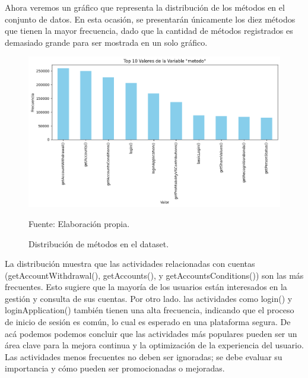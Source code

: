 Ahora veremos un gráfico que representa la distribución de los métodos en el conjunto de datos. En esta ocasión, se presentarán únicamente los diez métodos que tienen la mayor frecuencia, dado que la cantidad de métodos registrados es demasiado grande para ser mostrada en un solo gráfico.

\begin{figure}[H]
    \begin{minipage}[t]{0.9\textwidth}
        \caption{Distribución de métodos en el dataset.}
        \label{frecuencia-metodos}        
    \end{minipage}

    \vspace{10pt}

    \begin{minipage}[b]{1.0\textwidth}
        \centering
        \includegraphics[width=\textwidth]{img/frecuencia-metodo.png}        
    \end{minipage}

    \begin{minipage}[t]{0.9\textwidth}
        Fuente: Elaboración propia.
    \end{minipage}
\end{figure}

La distribución muestra que las actividades relacionadas con cuentas (getAccountWithdrawal(), getAccounts(), y getAccountsConditions()) son las más frecuentes. Esto sugiere que la mayoría de los usuarios están interesados en la gestión y consulta de sus cuentas. Por otro lado. las actividades como login() y loginApplication() también tienen una alta frecuencia, indicando que el proceso de inicio de sesión es común, lo cual es esperado en una plataforma segura. De acá podemos podemos concluir que las actividades más populares pueden ser un área clave para la mejora continua y la optimización de la experiencia del usuario. Las actividades menos frecuentes no deben ser ignoradas; se debe evaluar su importancia y cómo pueden ser promocionadas o mejoradas.


